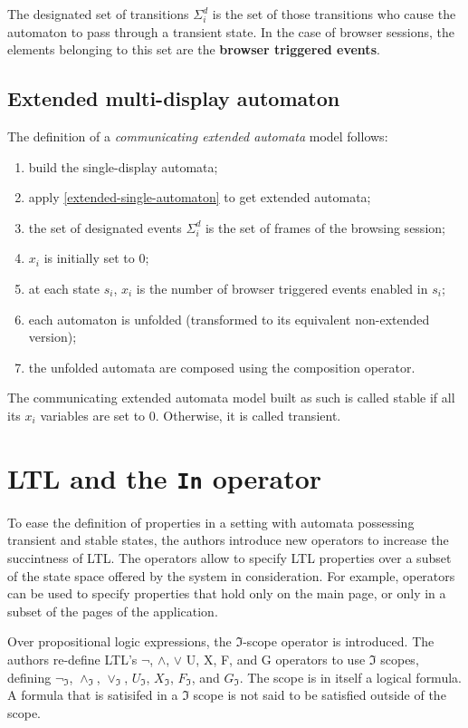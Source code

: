 \documentclass[a4paper,10pt]{article}
\theoremstyle{plain} %
\theoremstyle{definition}
\theoremstyle{remark}
\begin{document}
The designated set of transitions $\Sigma^d_i$ is the set of those transitions who cause the automaton to pass through a transient state. In the case of browser sessions, the elements belonging to this set are the \textbf{browser triggered events}.

\subsection{Extended multi-display automaton}

The definition of a \textit{communicating extended automata} model follows:

\begin{enumerate}
  \item build the single-display automata;
  \item apply \cref{extended-single-automaton} to get extended automata;
  \item the set of designated events $\Sigma^d_i$ is the set of frames of the browsing session;
  \item $x_i$ is initially set to 0;
  \item at each state $s_i$, $x_i$ is the number of browser triggered events enabled in $s_i$;
  \item each automaton is unfolded (transformed to its equivalent non-extended version);
  \item the unfolded automata are composed using the composition operator.
\end{enumerate}

The communicating extended automata model built as such is called stable if all its $x_i$ variables are set to 0. Otherwise, it is called transient.

\section{LTL and the \textbf{\texttt{In}} operator}

To ease the definition of properties in a setting with automata possessing transient and stable states, the authors introduce new operators to increase the succintness of LTL. The operators allow to specify LTL properties over a subset of the state space offered by the system in consideration. For example, operators can be used to specify properties that hold only on the main page, or only in a subset of the pages of the application.

Over propositional logic expressions, the $\mathcal{\Im}$-scope operator is introduced. The authors re-define LTL's $\neg$, $\land$, $\lor$ U, X, F, and G operators to use $\mathcal{\Im}$ scopes, defining $\neg_{\mathcal{\Im}}$, $\land_{\mathcal{\Im}}$, $\lor_{\mathcal{\Im}}$, $U_{\mathcal{\Im}}$, $X_{\mathcal{\Im}}$, $F_{\mathcal{\Im}}$, and $G_{\mathcal{\Im}}$. The scope is in itself a logical formula. A formula that is satisifed in a $\Im$ scope is not said to be satisfied outside of the scope.
\end{document}
